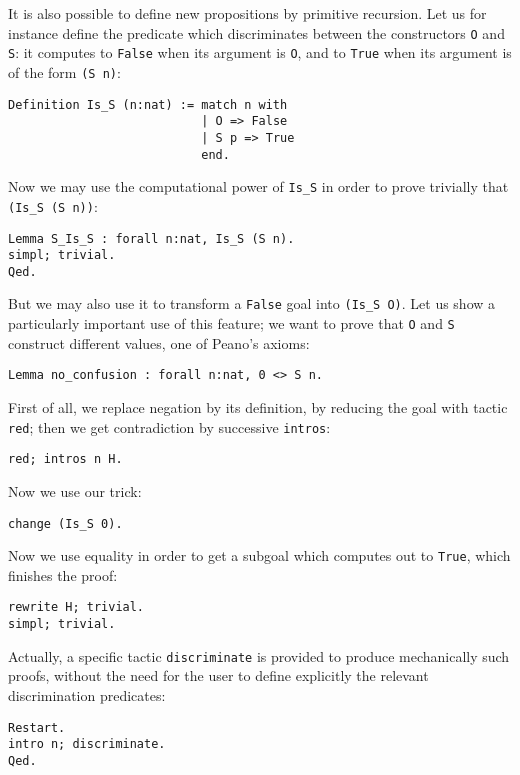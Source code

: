 \documentclass{book}
\begin{document}
It is also possible to define new propositions by primitive recursion.
Let us for instance define the predicate which discriminates between
the constructors \verb:O: and \verb:S:: it computes to \verb:False: 
when its argument is \verb:O:, and to \verb:True: when its argument is 
of the form \verb:(S n)::
\begin{lstlisting}
Definition Is_S (n:nat) := match n with
                           | O => False
                           | S p => True
                           end.
\end{lstlisting}

Now we may use the computational power of \verb:Is_S: in order to prove
trivially that \verb:(Is_S (S n))::
\begin{lstlisting}
Lemma S_Is_S : forall n:nat, Is_S (S n).
simpl; trivial.
Qed.
\end{lstlisting}

But we may also use it to transform a \verb:False: goal into 
\verb:(Is_S O):. Let us show a particularly important use of this feature;
we want to prove that \verb:O: and \verb:S: construct different values, one
of Peano's axioms:
\begin{lstlisting}
Lemma no_confusion : forall n:nat, 0 <> S n.
\end{lstlisting}

First of all, we replace negation by its definition, by reducing the
goal with tactic \verb:red:; then we get contradiction by successive
\verb:intros::
\begin{lstlisting}
red; intros n H.
\end{lstlisting}

Now we use our trick:
\begin{lstlisting}
change (Is_S 0).
\end{lstlisting}

Now we use equality in order to get a subgoal which computes out to 
\verb:True:, which finishes the proof:
\begin{lstlisting}
rewrite H; trivial.
simpl; trivial.
\end{lstlisting}

Actually, a specific tactic \verb:discriminate: is provided
to produce mechanically such proofs, without the need for the user to define
explicitly the relevant discrimination predicates:

\begin{lstlisting}
Restart.
intro n; discriminate.
Qed.
\end{lstlisting}
\end{document}
